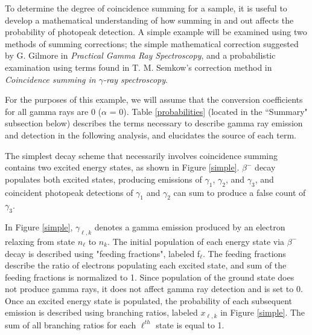 \documentclass[12pt,twoside]{reedthesis}
\begin{document}
To determine the degree of coincidence summing for a sample, it is useful to develop a mathematical understanding of how summing in and out affects the probability of photopeak detection. A simple example will be examined using two methods of summing corrections; the simple mathematical correction suggested by G. Gilmore in \textit{Practical Gamma Ray Spectroscopy}, and a probabilistic examination using terms found in T. M. Semkow's correction method in \textit{Coincidence summing in $\gamma$-ray spectroscopy}.

For the purposes of this example, we will assume that the conversion coefficients for all gamma rays are 0 (\textbf{$\alpha$} = $0$). Table \ref{probabilities} (located in the ``Summary" subsection below) describes the terms necessary to describe gamma ray emission and detection in the following analysis, and elucidates the source of each term.

The simplest decay scheme that necessarily involves coincidence summing contains two excited energy states, as shown in Figure \ref{simple}. $\beta^{-}$ decay populates both excited states, producing emissions of  $\gamma_{1}$, $\gamma_{2}$, and  $\gamma_{3}$, and coincident photopeak detections of $\gamma_{1}$ and $\gamma_{2}$ can sum to produce a false count of $\gamma_{3}$. 


In Figure \ref{simple}, $\gamma_{\ell,k}$ denotes a gamma emission produced by an electron relaxing from state $n_{\ell}$ to $n_{k}$. The initial population of each energy state via $\beta^{-}$ decay is described using "feeding fractions", labeled f$_{\ell}$. The feeding fractions describe the ratio of electrons populating each excited state, and sum of the feeding fractions is normalized to 1. Since population of the ground state does not produce gamma rays, it does not affect gamma ray detection and is set to 0. Once an excited energy state is populated, the probability of each subsequent emission is described using branching ratios, labeled $x_{\ell,k}$ in Figure \ref{simple}. The sum of all branching ratios for each $\ell^{th}$ state is equal to 1.
\end{document}
